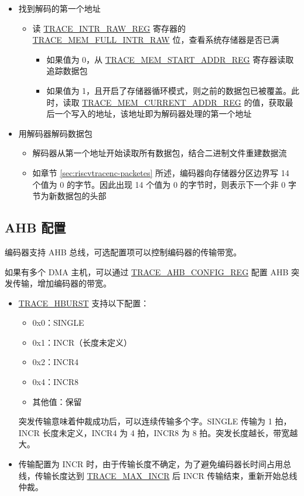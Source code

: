 \documentclass[main\_\_CN.tex]{subfiles}
\begin{document}
\begin{itemize}
    \item 找到解码的第一个地址
        \begin{itemize}
            \item 读 \hyperref[regdesc:TRACEINTRRAWREG]{TRACE\_INTR\_RAW\_REG} 寄存器的 \hyperref[fielddesc:TRACEMEMFULLINTRRAW]{TRACE\_MEM\_FULL\_INTR\_RAW} 位，查看系统存储器是否已满
            \begin{itemize}
                \item 如果值为 0，从 \hyperref[regdesc:TRACEMEMSTARTADDRREG]{TRACE\_MEM\_START\_ADDR\_REG} 寄存器读取追踪数据包
                \item 如果值为 1，且开启了存储器循环模式，则之前的数据包已被覆盖。此时，读取 \hyperref[regdesc:TRACEMEMCURRENTADDRREG]{TRACE\_MEM\_CURRENT\_ADDR\_REG} 的值，获取最后一个写入的地址，该地址即为解码器处理的第一个地址
            \end{itemize}
        \end{itemize}

    \item 用解码器解码数据包
        \begin{itemize}
            \item 解码器从第一个地址开始读取所有数据包，结合二进制文件重建数据流
            \item 如章节 \ref{sec:riscvtracenc-packetes} 所述，编码器向存储器分区边界写 14 个值为 0 的字节。因此出现 14 个值为 0 的字节时，则表示下一个非 0 字节为新数据包的头部
        \end{itemize}
\end{itemize}

\subsection{AHB 配置}

\chipname{} 编码器支持 AHB 总线，可选配置项可以控制编码器的传输带宽。

如果有多个 DMA 主机，可以通过 \hyperref[regdesc:TRACEAHBCONFIGREG]{TRACE\_AHB\_CONFIG\_REG} 配置 AHB 突发传输，增加编码器的带宽。
\begin{itemize}
    \item \hyperref[fielddesc:TRACEHBURST]{TRACE\_HBURST} 支持以下配置：
        \begin{itemize}
            \item 0x0：SINGLE
            \item 0x1：INCR（长度未定义）
            \item 0x2：INCR4
            \item 0x4：INCR8
            \item 其他值：保留
        \end{itemize}
        突发传输意味着仲裁成功后，可以连续传输多个字。SINGLE 传输为 1 拍，INCR 长度未定义，INCR4 为 4 拍，INCR8  为 8 拍。突发长度越长，带宽越大。

    \item 传输配置为 INCR 时，由于传输长度不确定，为了避免编码器长时间占用总线，传输长度达到 \hyperref[fielddesc:TRACEMAXINCR]{TRACE\_MAX\_INCR} 后 INCR 传输结束，重新开始总线仲裁。
\end{itemize}
\end{document}
